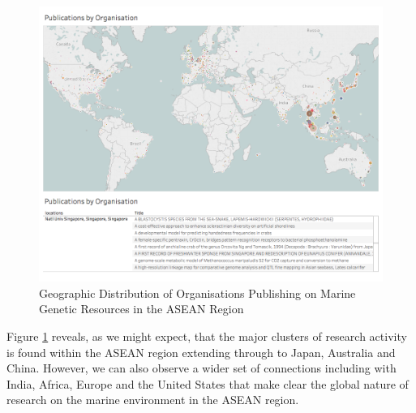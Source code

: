 \documentclass[openany]{book}
\theoremstyle{definition}
\theoremstyle{definition}
\theoremstyle{definition}
\theoremstyle{remark}
\begin{document}
\begin{figure}

{\centering \includegraphics[width=1\linewidth]{images/aseanmarinlit_organisation} 

}

\caption{Geographic Distribution of Organisations Publishing on Marine Genetic Resources in the ASEAN Region}\label{fig:organisationmap}
\end{figure}

Figure \ref{fig:organisationmap} reveals, as we might expect, that the
major clusters of research activity is found within the ASEAN region
extending through to Japan, Australia and China. However, we can also
observe a wider set of connections including with India, Africa, Europe
and the United States that make clear the global nature of research on
the marine environment in the ASEAN region.
\end{document}
